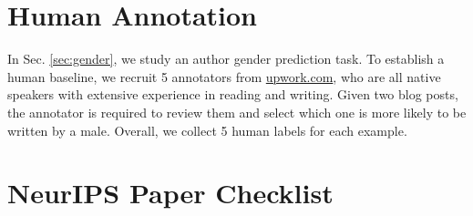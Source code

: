 \documentclass{article}
\begin{document}
\section{Human Annotation}

In Sec. \ref{sec:gender}, we study an author gender prediction task. To establish a human baseline, we recruit 5 annotators from \url{upwork.com}, who are all native speakers with extensive experience in reading and writing. Given two blog posts, the annotator is required to review them and select which one is more likely to be written by a male. Overall, we collect 5 human labels for each example.


\iffalse
\section*{NeurIPS Paper Checklist}



\end{document}
